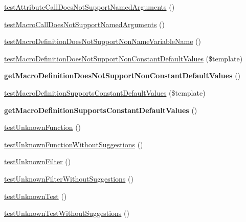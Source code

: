 \begin{DoxyCompactItemize}
\item 
\hyperlink{classTwig__Tests__ExpressionParserTest_aaf2c29f353ef47ba984204907ac587b6}{test\+Attribute\+Call\+Does\+Not\+Support\+Named\+Arguments} ()
\item 
\hyperlink{classTwig__Tests__ExpressionParserTest_a58b81637fd3d1b7cc0d87d32e0288e8b}{test\+Macro\+Call\+Does\+Not\+Support\+Named\+Arguments} ()
\item 
\hyperlink{classTwig__Tests__ExpressionParserTest_acc88626ee820edaff71e78fbee24a95e}{test\+Macro\+Definition\+Does\+Not\+Support\+Non\+Name\+Variable\+Name} ()
\item 
\hyperlink{classTwig__Tests__ExpressionParserTest_ae9b5c6269686233da6c587f4a2e0b150}{test\+Macro\+Definition\+Does\+Not\+Support\+Non\+Constant\+Default\+Values} (\$template)
\item 
{\bfseries get\+Macro\+Definition\+Does\+Not\+Support\+Non\+Constant\+Default\+Values} ()\hypertarget{classTwig__Tests__ExpressionParserTest_a33049854930980d83e042e4117b180e0}{}\label{classTwig__Tests__ExpressionParserTest_a33049854930980d83e042e4117b180e0}

\item 
\hyperlink{classTwig__Tests__ExpressionParserTest_ae1253bcaa65089761d7bf86f6a0d54d4}{test\+Macro\+Definition\+Supports\+Constant\+Default\+Values} (\$template)
\item 
{\bfseries get\+Macro\+Definition\+Supports\+Constant\+Default\+Values} ()\hypertarget{classTwig__Tests__ExpressionParserTest_abd980be1560d1f48921c7686c17f709f}{}\label{classTwig__Tests__ExpressionParserTest_abd980be1560d1f48921c7686c17f709f}

\item 
\hyperlink{classTwig__Tests__ExpressionParserTest_a5e06eabac7c7bcf6c2b1d2e44c74d516}{test\+Unknown\+Function} ()
\item 
\hyperlink{classTwig__Tests__ExpressionParserTest_a118abacbb5edb4792ae69145aa46824e}{test\+Unknown\+Function\+Without\+Suggestions} ()
\item 
\hyperlink{classTwig__Tests__ExpressionParserTest_a3a2b1b39e9f2963debeccca5127bcb22}{test\+Unknown\+Filter} ()
\item 
\hyperlink{classTwig__Tests__ExpressionParserTest_a99db7a11cb3a54a21240efff3167e552}{test\+Unknown\+Filter\+Without\+Suggestions} ()
\item 
\hyperlink{classTwig__Tests__ExpressionParserTest_a572e90444f7bbf47118bc2ca96a9c8dd}{test\+Unknown\+Test} ()
\item 
\hyperlink{classTwig__Tests__ExpressionParserTest_ac17844f60a2ec09ee44b4a974c1cc6e9}{test\+Unknown\+Test\+Without\+Suggestions} ()
\end{DoxyCompactItemize}


